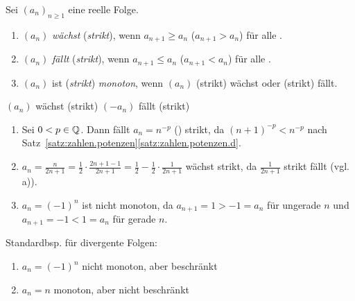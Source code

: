 \documentclass[12pt]{scrreprt}
\begin{document}
\begin{dfn}
  \label{dfn:konv.monotonie}
  Sei $(a_n)_{n\ge1}$ eine reelle Folge.
  \begin{enumerate}
  \item $(a_n)$ \emph{wächst} (\emph{strikt}), wenn $a_{n+1}\ge a_n$
    ($a_{n+1}>a_n$) für alle .
  \item $(a_n)$ \emph{fällt} (\emph{strikt}), wenn $a_{n+1}\le a_n$
    ($a_{n+1}<a_n$) für alle .
  \item $(a_n)$ ist (\emph{strikt}) \emph{monoton}, wenn $(a_n)$
    (strikt) wächst oder (strikt) fällt.
  \end{enumerate}
  \begin{bem*}
    $(a_n)$ wächst (strikt) \gdw $\left(-a_n\right)$ fällt (strikt)
  \end{bem*}
\end{dfn}

\begin{bsp}
  \label{bsp:konv.monotonie}
  \begin{enumerate}
  \item Sei $0<p\in\mathbb{Q}$. Dann fällt $a_n=n^{-p}$ () strikt,
    da $(n+1)^{-p}<n^{-p}$ nach
    Satz~\ref{satz:zahlen.potenzen}\ref{satz:zahlen.potenzen.d}.
  \item $a_n = \frac{n}{2n+1} = \frac12\cdot\frac{2n+1-1}{2n+1} =
    \frac12 - \frac12\cdot\frac{1}{2n+1}$ wächst strikt, da
    $\frac{1}{2n+1}$ strikt fällt (vgl. a)).
  \item $a_n=(-1)^n$ ist nicht monoton, da $a_{n+1}=1>-1=a_n$ für
    ungerade $n$ und $a_{n+1}=-1<1=a_n$ für gerade $n$.
  \end{enumerate}
\end{bsp}

\noindent Standardbsp. für divergente Folgen:
\begin{enumerate}
\item $a_n=(-1)^n$ nicht monoton, aber beschränkt
\item $a_n=n$ monoton, aber nicht beschränkt
\end{enumerate}
\end{document}
